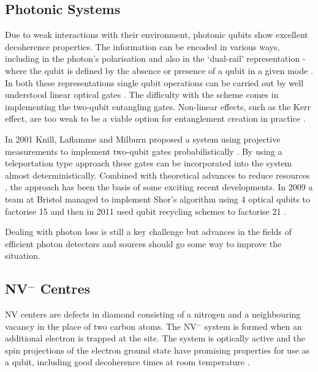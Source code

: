 \subsection{Photonic Systems}

Due to weak interactions with their environment, photonic qubits show excellent decoherence properties. The information can be encoded in various ways, including in the photon's polarisation and also in the `dual-rail' representation - where the qubit is defined by the absence or presence of a qubit in a given mode \cite{loqc_review_07}. In both these representations single qubit operations can be carried out by well understood linear optical gates \cite{fox_quantum_optics, walls+milburn}. The difficulty with the scheme comes in implementing the two-qubit entangling gates. Non-linear effects, such as the Kerr effect, are too weak to be a viable option for entanglement creation in practice \cite{kerr_too_weak_06}.

In 2001 Knill, Laflamme and Milburn proposed a system using projective measurements to implement two-qubit gates probabilistically \cite{klm}. By using a teleportation type approach these gates can be incorporated into the system almost deterministically. Combined with theoretical advances to reduce resources \cite{science_loqc_review}, the approach has been the basis of some exciting recent developments. In 2009 a team at Bristol managed to implement Shor's algorithm using 4 optical qubits to factorise 15 \cite{shor_chip_bristol} and then in 2011 used qubit recycling schemes to factorise 21 \cite{shor_chip_bristol_2}.  

Dealing with photon loss is still a key challenge but advances in the fields of efficient photon detectors \cite{single_photon_detector_review_09} and sources \cite{single_photon_source_review_04} should go some way to improve the situation.

\subsection{NV$^{-}$ Centres}

NV centers are defects in diamond consisting of a nitrogen and a neighbouring vacancy in the place of two carbon atoms. The NV$^{-}$ system is formed when an additional electron is trapped at the site. The system is optically active and the spin projections of the electron ground state have promising properties for use as a qubit, including good decoherence times at room temperature \cite{nv_review, nv_oscillation_04}. 

